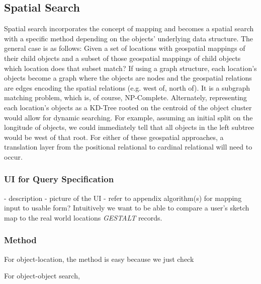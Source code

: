 \subsection{Spatial Search}
Spatial search incorporates the concept of mapping and becomes a spatial search with a specific method depending on the objects' underlying data structure. 
The general case is as follows: Given a set of locations with geospatial mappings of their child objects and a subset of those geospatial mappings of child objects which location does that subset match? 
If using a graph structure, each location's objects become a graph where the objects are nodes and the geospatial relations are edges encoding the spatial relations (e.g. west of, north of). It is a subgraph matching problem, which is, of course, NP-Complete. 
Alternately, representing each location's objects as a KD-Tree rooted on the centroid of the object cluster would allow for dynamic searching. For example, assuming an initial split on the longitude of objects, we could immediately tell that all objects in the left subtree would be west of that root. 
For either of these geospatial approaches, a translation layer from the positional relational to cardinal relational will need to occur.

\subsubsection{UI for Query Specification}
- description
- picture of the UI
- refer to appendix algorithm(s) for mapping input to usable form?
Intuitively we want to be able to compare a user's sketch map to the real world locations \emph{GESTALT} records. 

\subsubsection{Method}
For object-location, the method is easy because we just check 

For object-object search, 

